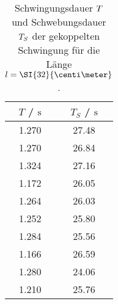 \begin{table}
    \centering
    \caption{Schwingungsdauer $\protect T$ und Schwebungsdauer $\protect T_{S}$ der gekoppelten Schwingung \hspace{\textwidth}
     für die Länge $\protect l = \SI{32}{\centi\meter}$.}
    \label{tab:tundts-_32}
    \begin{tabular}{c | c}
        \toprule
        $T$ / $\si{\second}$ & $T_{S}$ / $\si{\second}$\\
        \midrule
         1.270    &   27.48 \\
         1.270    &   26.84 \\
         1.324    &  27.16 \\ 
         1.172    &  26.05 \\ 
         1.264    &  26.03 \\ 
         1.252    &  25.80 \\ 
         1.284    &  25.56 \\ 
         1.166    &  26.59 \\ 
         1.280    &   24.06 \\
         1.210      & 25.76 \\  
        \bottomrule
    \end{tabular}
\end{table}

